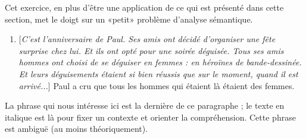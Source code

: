 \begin{exo}\label{exo:homfem}
Cet exercice, en plus d'être une application de ce qui est présenté
dans cette section, met le doigt sur un «petit» problème d'analyse
sémantique. 
\begin{enumerate}[label=(\alph*)]
\item {[\itshape{C'est l'anniversaire de Paul. Ses amis ont décidé d'organiser une fête surprise chez lui.  Et ils ont opté pour une soirée déguisée. Tous ses amis hommes ont choisi de se déguiser en femmes : en héroïnes de bande-dessinée. Et leurs déguisements étaient si bien réussis que sur le moment, quand il est arrivé...}}] Paul a cru que tous les hommes qui étaient là étaient des femmes.
\end{enumerate}

La phrase qui nous intéresse ici est la dernière de ce paragraphe ; le
texte en italique est là pour fixer un contexte et orienter la
compréhension.  Cette phrase est ambiguë (au moins théoriquement). %


\end{exo}
